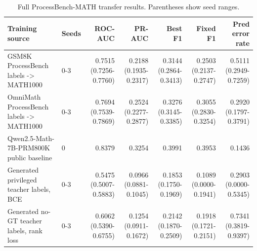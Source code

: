 \begin{table}[t]
\centering
\small
\begin{tabular}{llrrrrr}
\toprule
Training source & Seeds & ROC-AUC & PR-AUC & Best F1 & Fixed F1 & Pred error rate \\
\midrule
GSM8K ProcessBench labels -> MATH1000 & 0-3 & 0.7515 (0.7256-0.7760) & 0.2188 (0.1935-0.2317) & 0.3144 (0.2864-0.3413) & 0.2503 (0.2137-0.2747) & 0.5111 (0.2949-0.7259) \\
OmniMath ProcessBench labels -> MATH1000 & 0-3 & 0.7694 (0.7539-0.7869) & 0.2524 (0.2277-0.2877) & 0.3276 (0.3145-0.3385) & 0.3055 (0.2830-0.3254) & 0.2920 (0.1797-0.3791) \\
Qwen2.5-Math-7B-PRM800K public baseline & 0 & 0.8379 & 0.3254 & 0.3991 & 0.3953 & 0.1436 \\
Generated privileged teacher labels, BCE & 0-3 & 0.5475 (0.5007-0.5883) & 0.0966 (0.0881-0.1045) & 0.1853 (0.1750-0.1969) & 0.1089 (0.0000-0.1941) & 0.2903 (0.0000-0.5345) \\
Generated no-GT teacher labels, rank loss & 0-3 & 0.6062 (0.5390-0.6755) & 0.1254 (0.0911-0.1672) & 0.2142 (0.1870-0.2509) & 0.1918 (0.1721-0.2151) & 0.7341 (0.3819-0.9397) \\
\bottomrule
\end{tabular}
\caption{Full ProcessBench-MATH transfer results. Parentheses show seed ranges.}
\label{tab:phase-b-main-transfer}
\end{table}
